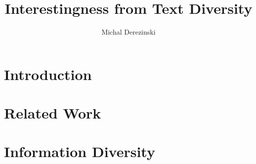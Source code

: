 \documentclass{article} %
\title{Interestingness from Text Diversity}
\author{Michal Derezinski}
\begin{document}
\maketitle



\begin{abstract}%
\end{abstract}


\section{Introduction}
\label{sec:introduction}



\section{Related Work}
\label{sec:related-work}



\section{Information Diversity}
\label{sec:information-diversity}
 

\end{document}
